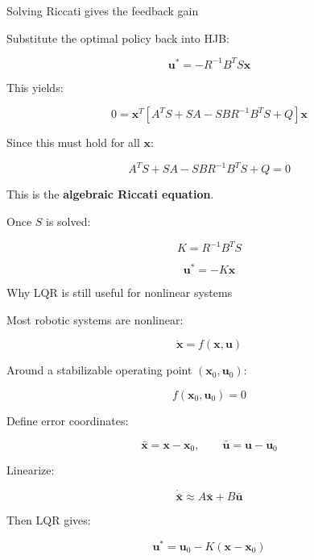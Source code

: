 \documentclass[aspectratio=169]{beamer}
\begin{document}
\begin{frame}{Solving Riccati gives the feedback gain}
\large

Substitute the optimal policy back into HJB:

\[
\bm{u}^* = -R^{-1}B^TS\bm{x}
\]

This yields:

\[
0 =
\bm{x}^T
\left[
A^TS + SA
-
SBR^{-1}B^TS
+
Q
\right]
\bm{x}
\]

Since this must hold for all $\bm{x}$:

\[
\boxed{
A^TS + SA
-
SBR^{-1}B^TS
+
Q
=
0
}
\]

This is the \textbf{algebraic Riccati equation}.

\vspace{0.3cm}

Once $S$ is solved:

\[
K = R^{-1}B^TS
\]

\[
\bm{u}^* = -K\bm{x}
\]

\end{frame}

\begin{frame}{Why LQR is still useful for nonlinear systems}
\large

Most robotic systems are nonlinear:

\[
\dot{\bm{x}} = f(\bm{x}, \bm{u})
\]

Around a stabilizable operating point $(\bm{x}_0,\bm{u}_0)$:

\[
f(\bm{x}_0,\bm{u}_0)=0
\]

Define error coordinates:

\[
\bar{\bm{x}} = \bm{x}-\bm{x}_0,
\qquad
\bar{\bm{u}} = \bm{u}-\bm{u}_0
\]

Linearize:

\[
\dot{\bar{\bm{x}}}
\approx
A\bar{\bm{x}} + B\bar{\bm{u}}
\]

Then LQR gives:

\[
\bm{u}^*
=
\bm{u}_0
-
K(\bm{x}-\bm{x}_0)
\]

\end{frame}
\end{document}
